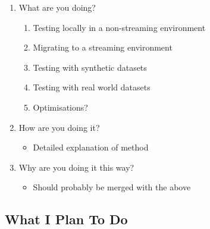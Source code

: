 \begin{enumerate}
    \item What are you doing?
    \begin{enumerate}
        \item Testing locally in a non-streaming environment
        \item Migrating to a streaming environment 
        \item Testing with synthetic datasets
        \item Testing with real world datasets
        \item Optimisations?
    \end{enumerate}
    \item How are you doing it?
    \begin{itemize}
        \item Detailed explanation of method
    \end{itemize}
    \item Why are you doing it this way?
    \begin{itemize}
        \item Should probably be merged with the above
    \end{itemize}
\end{enumerate}

\subsection{What I Plan To Do}

